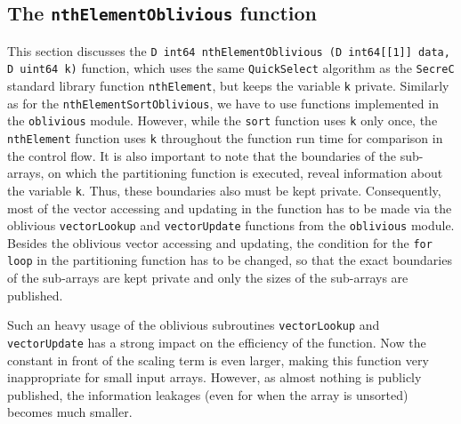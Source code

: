 \documentclass[11pt]{article}
\newcommand{\ct}[1]{\texttt{#1}}
\newcommand{\SC}{\ct{SecreC}\xspace}
\begin{document}


\subsection{The \ct{nthElementOblivious} function} %
\label{sub:the_nthelementoblivious_function}

This section discusses the \ct{D int64 nthElementOblivious (D int64[[1]] data, D uint64 k)} function, which uses the same \ct{QuickSelect} algorithm as the \SC standard library function \ct{nthElement}, but keeps the variable \ct{k} private. Similarly as for the \ct{nthElementSortOblivious}, we have to use functions implemented in the \ct{oblivious} module. However, while the \ct{sort} function uses \ct{k} only once, the \ct{nthElement} function uses \ct{k} throughout the function run time for comparison in the control flow. It is also important to note that the boundaries of the sub-arrays, on which the partitioning function is executed, reveal information about the variable \ct{k}. Thus, these boundaries also must be kept private. Consequently, most of the vector accessing and updating in the function has to be made via the oblivious \ct{vectorLookup} and \ct{vectorUpdate} functions from the \ct{oblivious} module. Besides the oblivious vector accessing and updating, the condition for the \ct{for loop} in the partitioning function has to be changed, so that the exact boundaries of the sub-arrays are kept private and only the sizes of the sub-arrays are published. 

Such an heavy usage of the oblivious subroutines \ct{vectorLookup} and \ct{vectorUpdate} has a strong impact on the efficiency of the function. Now the constant in front of the scaling term is even larger, making this function very inappropriate for small input arrays. However, as almost nothing is publicly published, the information leakages (even for when the array is unsorted) becomes much smaller.  


\end{document}
